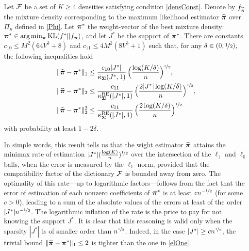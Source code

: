 \begin{proposition}\label{prop:1}
	Let $\cal F$ be a set of $K\ge 4$ densities satisfying condition \eqref{densConst}.
	Denote by $f_{\widehat{\boldsymbol \pi}}$ the mixture density corresponding to the maximum likelihood
	estimator $\widehat{\boldsymbol \pi}$ over $\Pi_n$ defined in \eqref{Phi}. Let $\boldsymbol \pi^*$ the weight-vector
	of the best mixture density: $\boldsymbol \pi^*\in\text{\rm arg}\min_{\boldsymbol \pi} {\rm KL}(f^*||f_{\boldsymbol \pi})$,
	and let $J^*$ be the support of $\boldsymbol \pi^*$. There are constants $c_{10}\le M^2(64V^3+8)$
	and $c_{11}\le 4M^2(8V^3+1)$ such that, for any
	$\delta \in (0,\nicefrac12)$, the following  inequalities hold
	\begin{align}
	\|\widehat{\boldsymbol \pi} - \boldsymbol \pi^*\|_1
	&\leq  \frac{c_{10}|J^*|}{\bar\kappa_{\boldsymbol\Sigma}(J^*,1)}\,\Big(\frac{\log(K/\delta)}{n}\Big)^{\nicefrac12},
	\label{elOne}\\
	\|\widehat{\boldsymbol \pi} - \boldsymbol \pi^*\|_2
	&\leq  \frac{c_{11}}{\kappa^{\rm RE}_{\boldsymbol\Sigma}(|J^*|,1)}\,\Big(\frac{2|J^*|\log(K/\delta)}{n}\Big)^{\nicefrac12},
	\label{euclOne}\\		
	\|\widehat{\boldsymbol \pi} - \boldsymbol \pi^*\|_2^2
	&\leq  \frac{c_{11}}{\kappa^{\rm RE}_{\boldsymbol\Sigma}(|J^*|,1)}\,\Big(\frac{2\log(K/\delta)}{n}\Big)^{\nicefrac12}
	\label{euclTwo}
	\end{align}
	with probability at least $1-2\delta$.
\end{proposition}


In simple words, this result tells us that the wight estimator $\widehat{\boldsymbol \pi}$  attains the
minimax rate of estimation $|J^* |(\frac{\log(K)}{n})^{\nicefrac12}$ over the intersection of the
$\ell_1$ and $\ell_0$ balls, when the error is measured by the $\ell_1$-norm, provided
that the compatibility factor of the dictionary $\mathcal F$ is bounded away from zero.
The optimality of this rate---up to logarithmic factors---follows from the fact that the
error of estimation of each nonzero coefficients of $\boldsymbol \pi^*$ is at least $cn^{-\nicefrac12}$ (for
some $c>0$), leading to a sum of the absolute values of the errors at least of the order
$|J^*|n^{-\nicefrac12}$. The logarithmic inflation of the rate is the price to pay for not knowing
the support $J^*$. It is clear that this reasoning is valid only when the sparsity
$|J^*|$ is of smaller order than $n^{\nicefrac12}$. Indeed, in the case $|J^*|\ge c n^{\nicefrac12}$,
the trivial bound $\|\widehat{\boldsymbol \pi}-\boldsymbol \pi^*\|_1\le 2$ is tighter than the one in \eqref{elOne}.

